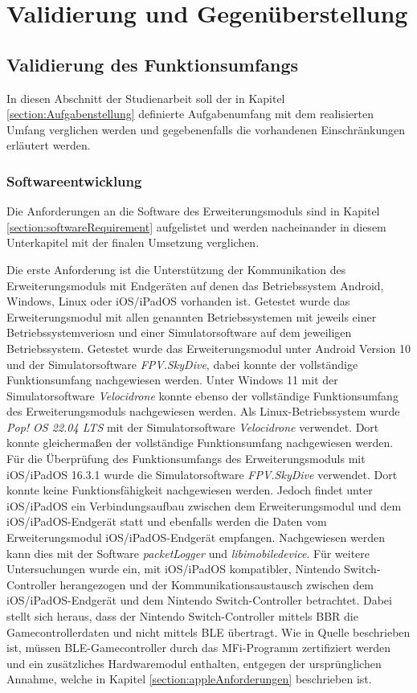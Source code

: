 
\chapter{Validierung und Gegenüberstellung}

\section{Validierung des Funktionsumfangs}

In diesen Abschnitt der Studienarbeit soll der in Kapitel \ref{section:Aufgabenstellung} definierte Aufgabenumfang mit dem realisierten Umfang verglichen werden und gegebenenfalls die vorhandenen Einschränkungen erläutert werden.

\subsection{Softwareentwicklung}
Die Anforderungen an die Software des Erweiterungsmoduls sind in Kapitel \ref{section:softwareRequirement} aufgelistet und werden nacheinander in diesem Unterkapitel mit der finalen Umsetzung verglichen.

Die erste Anforderung ist die Unterstützung der Kommunikation des Erweiterungsmoduls mit Endgeräten auf denen das Betriebssystem Android, Windows, Linux oder iOS/iPadOS vorhanden ist. Getestet wurde das Erweiterungsmodul mit allen genannten Betriebssystemen mit jeweils einer Betriebssystemveriosn und einer Simulatorsoftware auf dem jeweiligen Betriebssystem. Getestet wurde das Erweiterungsmodul unter Android Version 10 und der Simulatorsoftware \textit{FPV.SkyDive}, dabei konnte der vollständige Funktionsumfang nachgewiesen werden. Unter Windows 11 mit der Simulatorsoftware \textit{Velocidrone} konnte ebenso der vollständige Funktionsumfang des Erweiterungsmoduls nachgewiesen werden. Als Linux-Betriebssystem wurde \textit{Pop! OS 22.04 LTS} mit der Simulatorsoftware \textit{Velocidrone} verwendet. Dort konnte gleichermaßen der vollständige Funktionsumfang nachgewiesen werden. Für die Überprüfung des Funktionsumfangs des Erweiterungsmoduls mit iOS/iPadOS 16.3.1 wurde die Simulatorsoftware \textit{FPV.SkyDive} verwendet. Dort konnte keine Funktionsfähigkeit nachgewiesen werden. Jedoch findet unter iOS/iPadOS ein Verbindungsaufbau zwischen dem Erweiterungsmodul und dem iOS/iPadOS-Endgerät statt und ebenfalls werden die Daten vom Erweiterungsmodul iOS/iPadOS-Endgerät empfangen. Nachgewiesen werden kann dies mit der Software \textit{packetLogger} und \textit{libimobiledevice}. Für weitere Untersuchungen wurde ein, mit iOS/iPadOS kompatibler, Nintendo Switch-Controller herangezogen und der Kommunikationsaustausch zwischen dem iOS/iPadOS-Endgerät und dem Nintendo Switch-Controller betrachtet. Dabei stellt sich heraus, dass der Nintendo Switch-Controller mittels \ac{BBR} die Gamecontrollerdaten und nicht mittels \ac{BLE} übertragt. Wie in Quelle \cite{lemmingDevESP32Comment} beschrieben ist, müssen \ac{BLE}-Gamecontroller durch das \ac{MFi}-Programm zertifiziert werden und ein zusätzliches Hardwaremodul enthalten, entgegen der ursprünglichen Annahme, welche in Kapitel \ref{section:appleAnforderungen} beschrieben ist.

